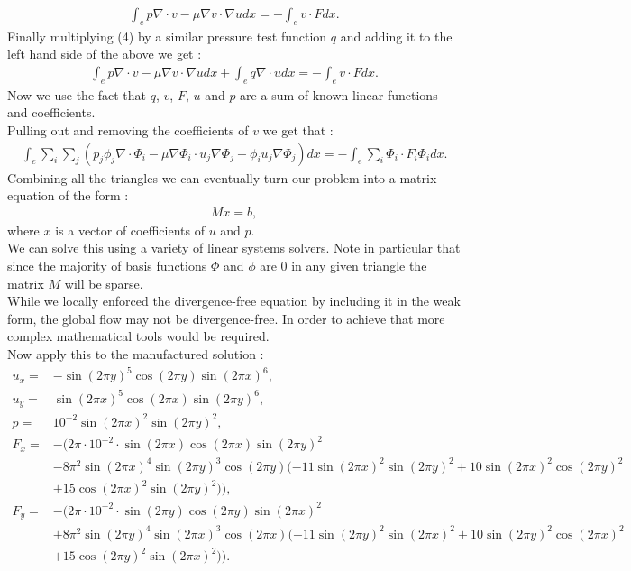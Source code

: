 \documentclass[11pt,twoside,a4paper]{article}
\begin{document}
\begin{align*}
\int_{e} p \nabla \cdot v - \mu \nabla v \cdot \nabla u dx = -\int_{e} v \cdot F dx .
\end{align*}
Finally multiplying (4) by a similar pressure test function $q$ and adding it to the left hand side of the above we get :
\begin{align}
\int_{e} p \nabla \cdot v - \mu \nabla v \cdot \nabla u dx + \int_{e} q \nabla \cdot u dx = -\int_{e} v \cdot F dx .
\end{align}
Now we use the fact that $q$, $v$, $F$, $u$ and $p$ are a sum of known linear functions and coefficients.\\
Pulling out and removing the coefficients of $v$ we get that :
\begin{align*}
 \int_{e} \sum_i \sum_j (  p_j \phi_j \nabla  \cdot \Phi_i - \mu \nabla \Phi_i \cdot u_j \nabla \Phi_j +   \phi_i u_j \nabla \Phi_j) dx = -\int_{e} \sum_i \Phi_i \cdot F_i \Phi_i dx .
\end{align*}
Combining all the triangles we can eventually turn our problem into a matrix equation of the form :
\begin{align}
M x = b ,
\end{align}
where $x$ is a vector of coefficients of $u$ and $p$.\\
We can solve this using a variety of linear systems solvers. Note in particular that since the majority of basis functions $\Phi$ and $\phi$ are $0$ in any given triangle the matrix $M$ will be sparse.\\
While we locally enforced the divergence-free equation by including it in the weak form, the global flow may not be divergence-free. In order to achieve that more complex mathematical tools would be required.\\
Now apply this to the manufactured solution :
\begin{align*}
u_x =  &-\sin(2 \pi y)^5 \cos(2 \pi y)  \sin(2 \pi x)^6, \\
u_y = &\sin(2 \pi x)^5 \cos(2 \pi x)  \sin(2 \pi y)^6, \\
p = &10^{-2} \sin(2 \pi x)^2 \sin(2 \pi y)^2, \\
F_x =& -(2 \pi \cdot 10^{-2} \cdot \sin( 2 \pi x) \cos(2 \pi x) \sin(2 \pi y)^2 \\
	&- 8 \pi^2 \sin(2 \pi x)^4 \sin(2 \pi y)^3 \cos(2 \pi y)(-11 \sin(2 \pi x)^2 \sin(2 \pi y)^2 + 10 \sin(2 \pi x)^2 \cos(2 \pi y)^2 \\
	& + 15 \cos(2 \pi x)^2 \sin(2 \pi y)^2 )),\\
F_y = &-(2 \pi \cdot 10^{-2} \cdot \sin( 2 \pi y) \cos(2 \pi y) \sin(2 \pi x)^2 \\
	&+ 8 \pi^2 \sin(2 \pi y)^4 \sin(2 \pi x)^3 \cos(2 \pi x)(-11 \sin(2 \pi y)^2 \sin(2 \pi x)^2 + 10 \sin(2 \pi y)^2 \cos(2 \pi x)^2 \\
	&+ 15 \cos(2 \pi y)^2 \sin(2 \pi x)^2 )).
\end{align*}
\end{document}
